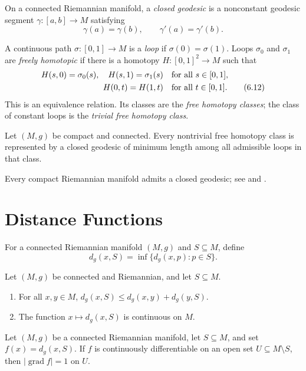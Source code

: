 On a connected Riemannian manifold, a \emph{closed geodesic} is a nonconstant
geodesic segment $\gamma\colon[a,b]\to M$ satisfying
\[
\gamma(a)=\gamma(b),
\qquad
\gamma'(a)=\gamma'(b).
\]

A continuous path $\sigma\colon[0,1]\to M$ is a \emph{loop} if
$\sigma(0)=\sigma(1)$. Loops $\sigma_0$ and $\sigma_1$ are \emph{freely
homotopic} if there is a homotopy $H\colon[0,1]^2\to M$ such that
\begin{align}
H(s,0)=\sigma_0(s),\quad H(s,1)=\sigma_1(s)
&\quad\text{for all }s\in[0,1], \notag\\
H(0,t)=H(1,t)&\quad\text{for all }t\in[0,1]. \tag{6.12}
\end{align}
This is an equivalence relation. Its classes are the \emph{free homotopy
classes}; the class of constant loops is the \emph{trivial free homotopy
class}.

\begin{proposition}
\label{prop:existence-closed-geodesics}
Let $(M,g)$ be compact and connected. Every nontrivial free homotopy class is
represented by a closed geodesic of minimum length among all admissible loops
in that class.
\end{proposition}

Every compact Riemannian manifold admits a closed geodesic; see
\cite{Jos17} and \cite{Kli95}.
\section{Distance Functions}

For a connected Riemannian manifold $(M,g)$ and $S\subseteq M$, define
\[
d_g(x,S)=\inf\{d_g(x,p):p\in S\}.
\]

\begin{lemma}
\label{lem:distance-triangle-inequality-and-continuity}

Let $(M,g)$ be connected and Riemannian, and let $S\subseteq M$.
\begin{enumerate}[label=(\alph*)]
\item For all $x,y\in M$,
$d_g(x,S)\leq d_g(x,y)+d_g(y,S)$.
\item The function $x\mapsto d_g(x,S)$ is continuous on $M$.
\end{enumerate}
\end{lemma}

\begin{theorem}
\label{thm:distance-to-subset-unit-gradient}

Let $(M,g)$ be a connected Riemannian manifold, let $S\subseteq M$, and set
$f(x)=d_g(x,S)$. If $f$ is continuously differentiable on an open set
$U\subseteq M\setminus S$, then
$|\operatorname{grad}f|=1$ on $U$.
\end{theorem}

